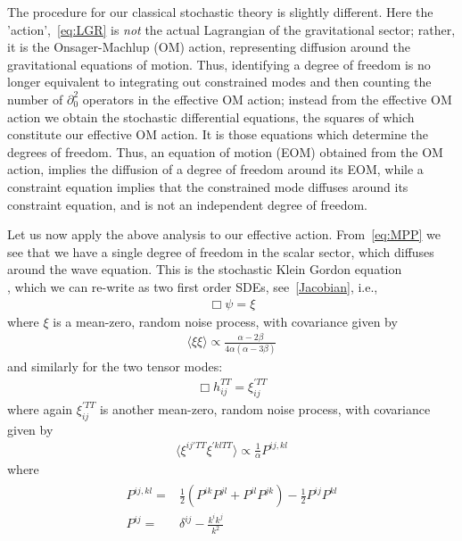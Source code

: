\documentclass[aps,preprintnumbers,superscriptaddress,longbibliography]{revtex4-1}
\begin{document}
The procedure for our classical stochastic theory is slightly different. Here the 'action',~\eqref{eq:LGR} is \textit{not} the actual Lagrangian of the gravitational sector; rather, it is the Onsager-Machlup (OM) action, representing diffusion around the gravitational equations of motion. Thus, identifying a degree of freedom is no longer equivalent to integrating out constrained modes and then counting the number of $\partial_0^2$ operators in the effective OM action; instead from the effective OM action we obtain the stochastic differential equations, the squares of which constitute our effective OM action. It is those equations which determine the degrees of freedom. 
Thus, an equation of motion (EOM) obtained from the OM action, implies the diffusion of a degree of freedom around its EOM, while a constraint equation implies that the constrained mode diffuses around its constraint equation, and is not an independent degree of freedom. 

Let us now apply the above analysis to our effective action. From~\eqref{eq:MPP} we see that we have a single degree of freedom in the scalar sector, which diffuses around the wave equation. This is the stochastic Klein Gordon equation\cite{oppenheim2025diffusion} \\\cite{balan2010stochastic}, which we can re-write as two first order SDEs, see~\eqref{Jacobian}, i.e., 
\begin{align}
\label{SDE:scalar}
  \Box\psi=\xi 
\end{align}
where $\xi$ is a mean-zero, random noise process, with covariance given by
\begin{align}
\langle\xi\xi\rangle\propto\frac{\alpha-2\beta}{4\alpha(\alpha-3\beta)}
\end{align}
and similarly for the two tensor modes:
\begin{align}
\label{SDE:tensor}
    \Box h_{ij}^{TT}=\xi_{ij}^{'TT}
\end{align}
where again $\xi_{ij}^{'TT}$ is another mean-zero, random noise process, with covariance given by
\begin{align}
\langle\xi^{ij'TT}\xi^{'kl TT}\rangle\propto\frac{1}{\alpha}P^{ij,kl}
\end{align}
where \begin{align}
\begin{split}
      \label{eq:projector3D}  P^{ij,kl}=&\frac{1}{2}(P^{ik}P^{jl}+P^{il}P^{jk})-\frac{1}{2}P^{ij}P^{kl}\\P^{ij}=&\delta^{ij}-\frac{k^{i}k^{j}}{k^2}
\end{split}
\end{align}
\end{document}
